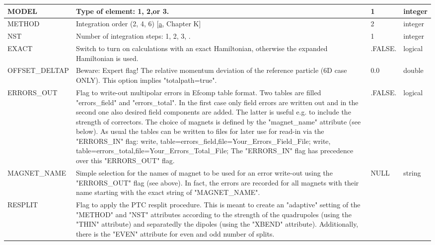 \begin{description}
\begin{longtable}{l p{8cm} p{2cm} p{2cm}}
\hline
MODEL &  Type of element: 1, 2,or 3. & 1 & integer \\ 
\hline
METHOD & Integration order (2, 4, 6) [\hyperlink{E.Forest}{a}, Chapter K] & 2 & integer \\ 
\hline
NST & Number of integration steps: 1, 2, 3,  . & 1 & integer \\ 
\hline
EXACT & Switch to turn on calculations with an exact Hamiltonian, otherwise the expanded Hamiltonian is used. & .FALSE. & logical \\ 
\hline
OFFSET\_DELTAP & Beware: Expert flag! The relative momentum deviation of the reference particle (6D case ONLY). This option implies "totalpath=true". & 0.0 & double \\ 
\hline
ERRORS\_OUT & Flag to write-out multipolar errors in Efcomp table format. Two     tables are filled "errors\_field"     and "errors\_total". In the first     case only field errors are written out and in the second one also     desired field components are added. The latter is useful e.g. to     include the strength of correctors. The choice of magnets is     defined by the "magnet\_name"     attribute (see below). As usual the tables can be     written to files for later use for read-in via the "ERRORS\_IN" flag:\newline
\newline
write, table=errors\_field,file=Your\_Errors\_Field\_File;\newline
write, table=errors\_total,file=Your\_Errors\_Total\_File;\newline
\newline
The "ERRORS\_IN" flag has precedence over     this "ERRORS\_OUT" flag.   & 
.FALSE. & logical \\
\hline
MAGNET\_NAME & 
  Simple selection for the names of magnet to be used for an error write-out   using the "ERRORS\_OUT" flag (see above).   In fact, the errors are recorded for all magnets with their name starting with  the exact string of "MAGNET\_NAME".   & 
NULL & string \\
\hline
RESPLIT & 
  Flag to apply the PTC resplit procedure. This is meant to        create an "adaptive" setting of the "METHOD" and  "NST"  attributes according to the        strength of the quadrupoles (using the "THIN"  attribute) and separatedly the        dipoles (using the "XBEND"  attribute). Additionally, there        is the  "EVEN" attribute for even and odd number        of splits. & 


\end{longtable}
\end{description}
